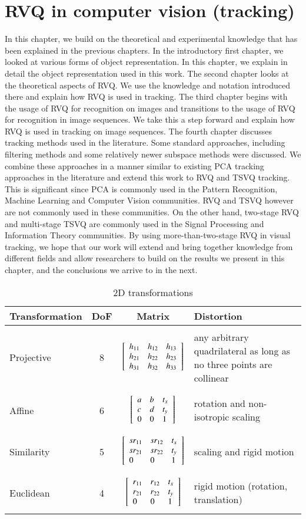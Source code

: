 \chapter{RVQ in computer vision (tracking)}
\label{chap_RVQ_STT}	
In this chapter, we build on the theoretical and experimental knowledge that has been explained in the previous chapters.  In the introductory first chapter, we looked at various forms of object representation.  In this chapter, we explain in detail the object representation used in this work.  The second chapter looks at the theoretical aspects of RVQ.  We use the knowledge and notation introduced there and explain how RVQ is used in tracking.  The third chapter begins with the usage of RVQ for recognition on images and transitions to the usage of RVQ for recognition in image sequences.  We take this a step forward and explain how RVQ is used in tracking on image sequences.  The fourth chapter discusses tracking methods used in the literature.  Some standard approaches, including filtering methods and some relatively newer subspace methods were discussed.  We combine these approaches in a manner similar to existing PCA tracking approaches in the literature and extend this work to RVQ and TSVQ tracking.  This is significant since PCA is commonly used in the Pattern Recognition, Machine Learning and Computer Vision communities.  RVQ and TSVQ however are not commonly used in these communities.  On the other hand, two-stage RVQ and multi-stage TSVQ are commonly used in the Signal Processing and Information Theory communities.  By using more-than-two-stage RVQ in visual tracking, we hope that our work will extend and bring together knowledge from different fields and allow researchers to build on the results we present in this chapter, and the conclusions we arrive to in the next.

\begin{table}[t]
\centering
\begin{tabular}{| l | c | c | p{2.5in} |}
\hline
Transformation & DoF & Matrix & Distortion\\ \hline 
& & & \\ Projective & 8 & $\left[ \begin{array}{lll} h_{11} & h_{12} & h_{13} \\ h_{21} & h_{22} & h_{23} \\ h_{31} & h_{32} & h_{33} \\ \end{array} \right]$ & any arbitrary quadrilateral as long as no three points are collinear\\  & & & \\ \hline
& & & \\ Affine & 6 & $\left[ \begin{array}{lll} a &b & t_x \\ c & d & t_y \\ 0 & 0 & 1 \\ \end{array} \right]$ & rotation and non-isotropic scaling\\  & & & \\ \hline
& & & \\ Similarity & 5 & $\left[ \begin{array}{lll} sr_{11} & sr_{12} & t_x \\ sr_{21} & sr_{22} & t_y \\ 0 & 0 & 1 \\ \end{array} \right]$ & scaling and rigid motion\\  & & & \\ \hline
& & & \\ Euclidean & 4 & $\left[ \begin{array}{lll} r_{11} & r_{12} & t_x \\ r_{21} & r_{22} & t_y \\ 0 & 0 & 1 \\ \end{array} \right]$ & rigid motion (rotation, translation) \\  & & & \\ \hline
\end{tabular}\
\caption{2D transformations}
\label{table:2Dtransformations}
\end{table}

